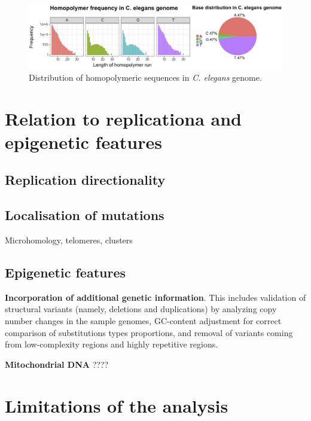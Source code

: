 \begin{figure}
  \centering
  \centerline{\includegraphics[width=1\textwidth]{figures/elegans_genome_homopolymers.png}}
  \caption{Distribution of homopolymeric sequences in \textit{C. elegans} genome.}
  \label{worm_homo}
\end{figure}



\section{Relation to replicationa and epigenetic features}

\subsection{Replication directionality}

\subsection{Localisation of mutations}

Microhomology, telomeres, clusters

\subsection{Epigenetic features}

\textbf{Incorporation of additional genetic information}. This includes validation of structural variants (namely, deletions and duplications) by analyzing copy number changes in the sample genomes, GC-content adjustment for correct comparison of substitutions types proportions, and removal of variants coming from low-complexity regions and highly repetitive regions. 

\textbf{Mitochondrial DNA} ????



\section{Limitations of the analysis}

